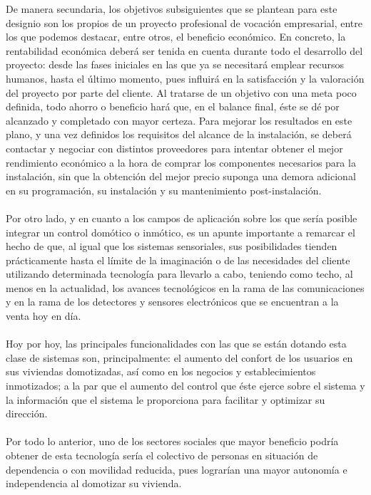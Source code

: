 De manera secundaria, los objetivos subsiguientes que se plantean para este designio son los propios de un proyecto profesional de vocación empresarial, entre los que podemos destacar, entre otros, el beneficio económico. En concreto, la rentabilidad económica deberá ser tenida en cuenta durante todo el desarrollo del proyecto: desde las fases iniciales en las que ya se necesitará emplear recursos humanos, hasta el último momento, pues influirá en la satisfacción y la valoración del proyecto por parte del cliente. Al tratarse de un objetivo con una meta poco definida, todo ahorro o beneficio hará que, en el balance final, éste se dé por alcanzado y completado con mayor certeza. Para mejorar los resultados en este plano, y una vez definidos los requisitos del alcance de la instalación, se deberá contactar y negociar con distintos proveedores para intentar obtener el mejor rendimiento económico a la hora de comprar los componentes necesarios para la instalación, sin que la obtención del mejor precio suponga una demora adicional en su programación, su instalación y su mantenimiento post-instalación.\\\\
 
Por otro lado, y en cuanto a los campos de aplicación sobre los que sería posible integrar un control domótico o inmótico, es un apunte importante a remarcar el hecho de que, al igual que los sistemas sensoriales, sus posibilidades tienden prácticamente hasta el límite de la imaginación o de las necesidades del cliente utilizando determinada tecnología para llevarlo a cabo, teniendo como techo, al menos en la actualidad, los avances tecnológicos en la rama de las comunicaciones y en la rama de los detectores y sensores electrónicos que se encuentran a la venta hoy en día. \\\\ 
Hoy por hoy, las principales funcionalidades con las que se están dotando esta clase de sistemas son, principalmente: el aumento del confort de los usuarios en sus viviendas domotizadas, así como en los negocios y establecimientos inmotizados; a la par que el aumento del control que éste ejerce sobre el sistema y la información que el sistema le proporciona para facilitar y optimizar su dirección. \\\\
Por todo lo anterior, uno de los sectores sociales que mayor beneficio podría obtener de esta tecnología sería el colectivo de personas en situación de dependencia o con movilidad reducida, pues lograrían una mayor autonomía e independencia al domotizar su vivienda.



